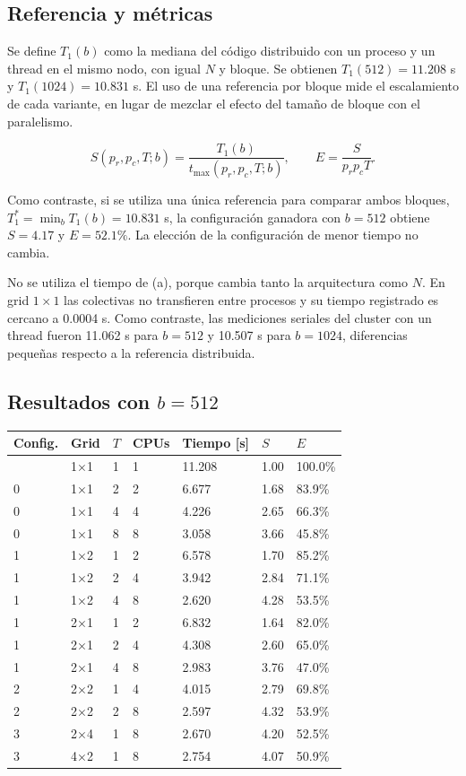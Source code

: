 \documentclass[
  spanish,
  11pt,
  a4paper,
]{article}
\newcounter{none} %
\begin{document}
\subsection{Referencia y métricas}\label{referencia-y-muxe9tricas}

Se define \(T_1(b)\) como la mediana del código distribuido con un
proceso y un thread en el mismo nodo, con igual \(N\) y bloque. Se
obtienen \(T_1(512)=11.208\) s y \(T_1(1024)=10.831\) s. El uso de una
referencia por bloque mide el escalamiento de cada variante, en lugar de
mezclar el efecto del tamaño de bloque con el paralelismo.

\[S(p_r,p_c,T;b)=\frac{T_1(b)}{t_{\max}(p_r,p_c,T;b)},\qquad
E=\frac{S}{p_rp_cT}.\]

Como contraste, si se utiliza una única referencia para comparar ambos
bloques, \(T_1^*=\min_bT_1(b)=10.831\) s, la configuración ganadora con
\(b=512\) obtiene \(S=4.17\) y \(E=52.1\%\). La elección de la
configuración de menor tiempo no cambia.

No se utiliza el tiempo de (a), porque cambia tanto la arquitectura como
\(N\). En grid \(1\times1\) las colectivas no transfieren entre procesos
y su tiempo registrado es cercano a 0.0004 s. Como contraste, las
mediciones seriales del cluster con un thread fueron 11.062 s para
\(b=512\) y 10.507 s para \(b=1024\), diferencias pequeñas respecto a la
referencia distribuida.

\subsection{\texorpdfstring{Resultados con
\(b=512\)}{Resultados con b=512}}\label{resultados-con-b512}

{\def\LTcaptype{none} %
\begin{longtable}[]{@{}lllllll@{}}
\toprule\noalign{}
Config. & Grid & \(T\) & CPUs & Tiempo {[}s{]} & \(S\) & \(E\) \\
\midrule\noalign{}
\endhead
\bottomrule\noalign{}
\endlastfoot
0 & 1×1 & 1 & 1 & 11.208 & 1.00 & 100.0\% \\
0 & 1×1 & 2 & 2 & 6.677 & 1.68 & 83.9\% \\
0 & 1×1 & 4 & 4 & 4.226 & 2.65 & 66.3\% \\
0 & 1×1 & 8 & 8 & 3.058 & 3.66 & 45.8\% \\
1 & 1×2 & 1 & 2 & 6.578 & 1.70 & 85.2\% \\
1 & 1×2 & 2 & 4 & 3.942 & 2.84 & 71.1\% \\
1 & 1×2 & 4 & 8 & 2.620 & 4.28 & 53.5\% \\
1 & 2×1 & 1 & 2 & 6.832 & 1.64 & 82.0\% \\
1 & 2×1 & 2 & 4 & 4.308 & 2.60 & 65.0\% \\
1 & 2×1 & 4 & 8 & 2.983 & 3.76 & 47.0\% \\
2 & 2×2 & 1 & 4 & 4.015 & 2.79 & 69.8\% \\
2 & 2×2 & 2 & 8 & 2.597 & 4.32 & 53.9\% \\
3 & 2×4 & 1 & 8 & 2.670 & 4.20 & 52.5\% \\
3 & 4×2 & 1 & 8 & 2.754 & 4.07 & 50.9\% \\
\end{longtable}
}
\end{document}
